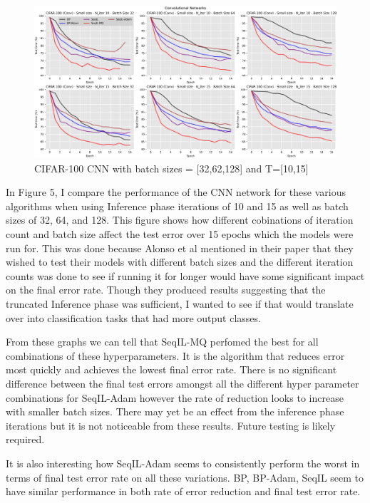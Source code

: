\documentclass{article}
\theoremstyle{plain}
\theoremstyle{definition}
\theoremstyle{remark}
\begin{document}
\begin{figure}[ht]
    \begin{center}
        \centerline{\includegraphics[width=\paperwidth]{images/cifar_run3_results_alt.png}}
    \caption{CIFAR-100 CNN with batch sizes = [32,62,128] and T=[10,15]}
    \end{center}
\end{figure}

In Figure 5, I compare the performance of the CNN network for these various algorithms when using 
Inference phase iterations of 10 and 15 as well as batch sizes of 32, 64, and 128. This figure shows 
how different cobinations of iteration count and batch size affect the test error over 15 epochs which the 
models were run for. This was done because Alonso et al mentioned in their paper that they wished to test their models 
with different batch sizes and the different iteration counts was done to see if running it for longer 
would have some significant impact on the final error rate. Though they produced results 
suggesting that the truncated Inference phase was sufficient, I wanted to see if that would translate over into classification 
tasks that had more output classes. 

From these graphs we can tell that SeqIL-MQ perfomed the best for all combinations of these hyperparameters.
It is the algorithm that reduces error most quickly and achieves the lowest final error rate. There is no
significant difference between the final test errors amongst all the different hyper parameter combinations for SeqIL-Adam
however the rate of reduction looks to increase with smaller batch sizes. There may yet be an effect from 
the inference phase iterations but it is not noticeable from these results. Future testing is likely required.

It is also interesting how SeqIL-Adam seems to consistently perform the worst in terms of 
final test error rate on all these variations. BP, BP-Adam, SeqIL seem to have similar performance in both rate of 
error reduction and final test error rate.
\end{document}

